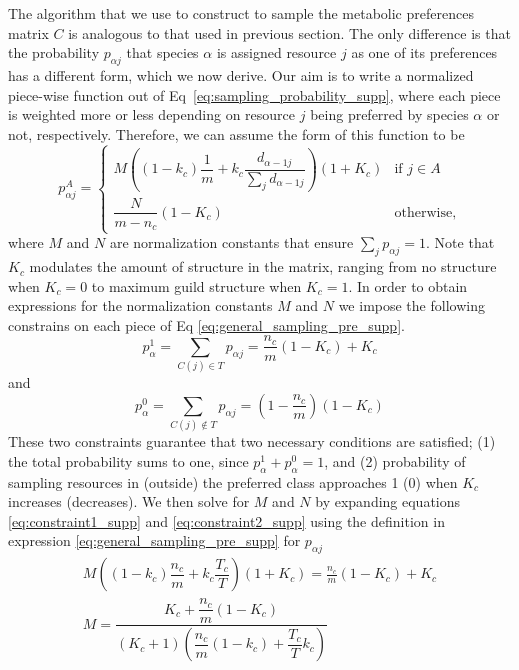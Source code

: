 \documentclass[12pt]{article}
\begin{document}
The algorithm that we use to construct to sample the metabolic preferences matrix $C$ is analogous to that used in previous section. The only difference is that the probability $p_{\alpha j}$ that species $\alpha$ is assigned resource $j$ as one of its preferences has a different form, which we now derive. Our aim is to write a normalized piece-wise function out of Eq~\ref{eq:sampling_probability_supp}, where each piece is weighted more or less depending on resource $j$ being preferred by species $\alpha$ or not, respectively. Therefore, we can assume the form of this function to be
\begin{equation}\label{eq:general_sampling_pre_supp}
    p^A_{\alpha j} = 
     \begin{cases}
        M\left((1-k_c) \dfrac{1}{m}  + k_c \dfrac{d_{{\alpha} -1j}}{\sum_{j}d_{{\alpha}-1j}}\right)(1+K_c) & \text{if } j \in A  \\[10pt]
        \dfrac{N}{m-n_c}(1-K_c) & \text{otherwise},
     \end{cases}
\end{equation}
where $M$ and $N$ are normalization constants that ensure $\sum_j p_{\alpha j} = 1$. Note that $K_c$ modulates the amount of structure in the matrix, ranging from no structure when $K_c = 0$ to maximum guild structure when $K_c = 1$. 
In order to obtain expressions for the normalization constants $M$ and $N$ we impose the following constrains on each piece of Eq \ref{eq:general_sampling_pre_supp}. 
\begin{equation}\label{eq:constraint1_supp}
     p^{1}_{\alpha} = \sum\limits_{C(j) \in T} p_{\alpha j} = \frac{n_c}{m}(1-K_c) + K_c
\end{equation}
and 
\begin{equation}\label{eq:constraint2_supp}
     p^{0}_{\alpha} = \sum\limits_{C(j) \not\in T} p_{\alpha j} = \left(1-\frac{n_c}{m}\right)(1-K_c)
\end{equation}
These two constraints guarantee that two necessary conditions are satisfied; (1) the total probability sums to one, since $p^{1}_{\alpha} + p^{0}_{\alpha} = 1$, and (2) probability of sampling resources in (outside) the preferred class approaches 1 (0) when $K_c$ increases (decreases).
We then solve for $M$ and $N$ by expanding equations \ref{eq:constraint1_supp} and \ref{eq:constraint2_supp} using the definition in expression \ref{eq:general_sampling_pre_supp} for $p_{\alpha j}$
\begin{align*}
     M\left((1-k_c) \dfrac{n_c}{m}  + k_c \dfrac{T_c}{T}\right)(1+K_c) = \frac{n_c}{m}(1-K_c) + K_c \nonumber\\
      M =    \dfrac{K_c + \dfrac{ n_c }{m}\left(1 - K_c\right)}{\left(K_c + 1\right) \left(\dfrac{n_c }{m}\left(1 - k_c\right) + \dfrac{T_c }{T}k_c\right)}
\end{align*}
\end{document}
